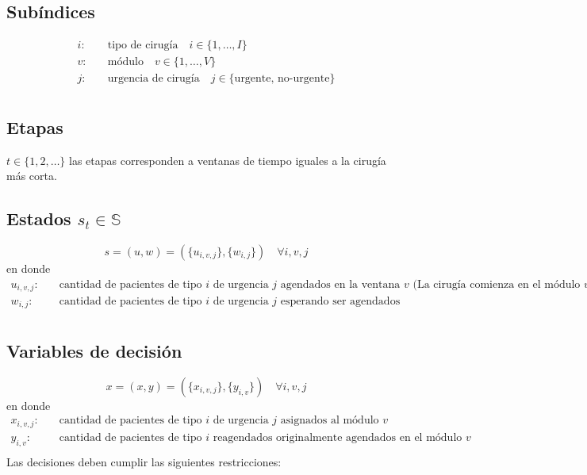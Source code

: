 \documentclass[letterpaper,10pt]{article}
\begin{document}
\subsection*{Subíndices}
    \begin{align*}
        i: & \quad \text{tipo de cirugía} \quad i \in \{1, \ldots, I\} \\
        v: & \quad \text{módulo} \quad v \in \{1, \ldots, V\} \\
        j: & \quad \text{urgencia de cirugía} \quad j \in \{\text{urgente, no-urgente}\} \\
    \end{align*}

\subsection*{Etapas}
$ t \in \{1, 2, \dots \} $
    las etapas corresponden a ventanas de tiempo iguales a la cirugía más corta. 

    \subsection*{Estados $s_t \in \mathds{S}$}
    
    $$s = (u, w) = (\{u_{i,v,j}\}, \{w_{i,j}\}) \quad \forall i,v,j$$ en donde
    \begin{align*}
        u_{i,v,j}:  & \quad \text{cantidad de pacientes de tipo $i$ de urgencia $j$ agendados en la ventana $v$ (La cirugía comienza en el módulo $v$). } \\
        w_{i,j}: & \quad \text{cantidad de pacientes de tipo $i$ de urgencia $j$ esperando ser agendados} \\
    \end{align*}

\subsection*{Variables de decisión}
    
    $$x = (x, y) = (\{x_{i,v, j}\}, \{y_{i,v}\}) \quad \forall i,v,j$$ en donde 
    \begin{align*}
        x_{i,v,j}: & \quad \text{cantidad de pacientes de tipo $i$ de urgencia $j$ asignados al módulo $v$} \\
        y_{i,v}: & \quad \text{cantidad de pacientes de tipo $i$ reagendados originalmente agendados en el módulo $v$} \\
    \end{align*}
   Las decisiones deben cumplir las siguientes restricciones:
    
\end{document}
